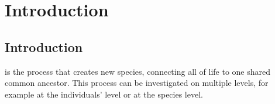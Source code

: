 \chapter{Introduction}
\label{chapter_introduction}

\newpage

\section{Introduction}

\noindent 
{} is the process that creates new species,
connecting all of life to one shared common ancestor. This process
can be investigated on multiple levels, for example at the individuals'
level or at the species level. 


